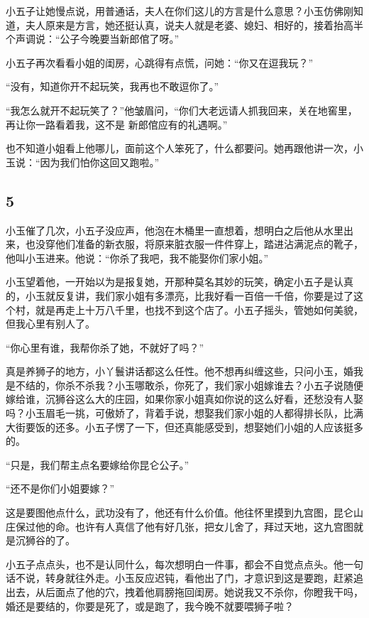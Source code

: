 小五子让她慢点说，用普通话，夫人在你们这儿的方言是什么意思？小玉仿佛刚知道，夫人原来是方言，她还挺认真，说夫人就是老婆、媳妇、相好的，接着抬高半个声调说：“公子今晚要当新郎倌了呀。”

小五子再次看看小姐的闺房，心跳得有点慌，问她：“你又在逗我玩？”

“没有，知道你开不起玩笑，我再也不敢逗你了。”

“我怎么就开不起玩笑了？”他皱眉问，“你们大老远请人抓我回来，关在地窖里，再让你一路看着我，这不是
新郎倌应有的礼遇啊。”

也不知道小姐看上他哪儿，面前这个人笨死了，什么都要问。她再跟他讲一次，小玉说：“因为我们怕你这回又跑啦。”
\newline

{\centering\subsection{5}}

小玉催了几次，小五子没应声，他泡在木桶里一直想着，想明白之后他从水里出来，也没穿他们准备的新衣服，将原来脏衣服一件件穿上，踏进沾满泥点的靴子，他叫小玉进来。他说：“你杀了我吧，我不能娶你们家小姐。”

小玉望着他，一开始以为是报复她，开那种莫名其妙的玩笑，确定小五子是认真的，小玉就反复讲，我们家小姐有多漂亮，比我好看一百倍一千倍，你要是过了这个村，就是再走上十万八千里，也找不到这个店了。小五子摇头，管她如何美貌，但我心里有别人了。

“你心里有谁，我帮你杀了她，不就好了吗？”

真是养狮子的地方，小丫鬟讲话都这么任性。他不想再纠缠这些，只问小玉，婚我是不结的，你杀不杀我？小玉哪敢杀，你死了，我们家小姐嫁谁去？小五子说随便嫁给谁，沉狮谷这么大的庄园，如果你家小姐真如你说的这么好看，还愁没有人娶吗？小玉眉毛一挑，可傲娇了，背着手说，想娶我们家小姐的人都得排长队，比满大街要饭的还多。小五子愣了一下，但还真能感受到，想娶她们小姐的人应该挺多的。

“只是，我们帮主点名要嫁给你昆仑公子。”

“还不是你们小姐要嫁？”

这是要图他点什么，武功没有了，他还有什么价值。他往怀里摸到九宫图，昆仑山庄保过他的命。也许有人真信了他有好几张，把女儿舍了，拜过天地，这九宫图就是沉狮谷的了。

小五子点点头，也不是认同什么，每次想明白一件事，都会不自觉点点头。他一句话不说，转身就往外走。小玉反应迟钝，看他出了门，才意识到这是要跑，赶紧追出去，从后面点了他的穴，拽着他肩膀拖回闺房。她说我又不杀你，你瞪我干吗，婚还是要结的，你要是死了，或是跑了，我今晚不就要喂狮子啦？


